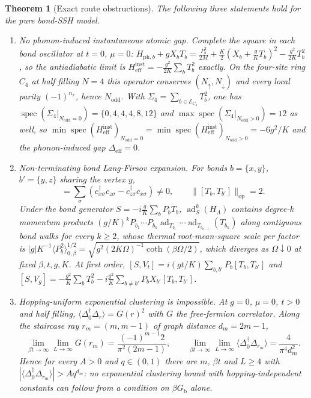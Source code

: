 \documentclass[11pt]{article}
\newtheorem{theorem}{Theorem}[section]
\theoremstyle{definition}
\theoremstyle{remark}
\DeclareMathOperator{\spec}{spec}
\newcommand{\Gb}{G_{\mathrm{b}}}
\begin{document}
\begin{theorem}[Exact route obstructions]
\label{thm:routes}
The following three statements hold for the pure bond-SSH model.
\begin{enumerate}[label=(\roman*),leftmargin=2.2em]
\item \emph{No phonon-induced instantaneous atomic gap.} Complete the square in each
bond oscillator at $t=0$, $\mu=0$:
$H_{\mathrm{ph},b}+gX_bT_b=\frac{P_b^2}{2M}+\frac{K}{2}(X_b+\frac{g}{K}T_b)^2
-\frac{g^2}{2K}T_b^2$, so the antiadiabatic limit is
$H^{\mathrm{inst}}_{\mathrm{eff}}=-\frac{g^2}{2K}\sum_bT_b^2$ exactly. On the
four-site ring $C_4$ at half filling $N=4$ this operator conserves
$(N_\uparrow,N_\downarrow)$ and every local parity $(-1)^{n_x}$, hence $N_{\mathrm{odd}}$.
With $\Sigma_4=\sum_{b\in\mathcal{E}_{C_4}}T_b^2$, one has
$\spec(\Sigma_4|_{N_{\mathrm{odd}}=0})=\{0,4,4,4,8,12\}$ and
$\max\spec(\Sigma_4|_{N_{\mathrm{odd}}>0})=12$ as well, so
$\min\spec(H^{\mathrm{inst}}_{\mathrm{eff}})_{N_{\mathrm{odd}}=0}=
\min\spec(H^{\mathrm{inst}}_{\mathrm{eff}})_{N_{\mathrm{odd}}>0}=-6g^2/K$ and the
phonon-induced gap
$\Delta_{\mathrm{eff}}=0$.
\item \emph{Non-terminating bond Lang-Firsov expansion.} For bonds
$b=\{x,y\}$, $b'=\{y,z\}$ sharing the vertex $y$,
\begin{equation}
[T_b,T_{b'}]=\sum_{\sigma}\left(c_{x\sigma}^\dagger c_{z\sigma}
-c_{z\sigma}^\dagger c_{x\sigma}\right)\ne0,\qquad
\bigl\|[T_b,T_{b'}]\bigr\|_{\mathrm{op}}=2 .
\label{eq:bondcomm}
\end{equation}
Under the bond generator $S=-i\frac{g}{K}\sum_bP_bT_b$,
$\operatorname{ad}_S^k(H_\Lambda)$ contains degree-$k$ momentum products
$(g/K)^kP_{b_1}\cdots P_{b_k}\operatorname{ad}_{T_{b_1}}\cdots
\operatorname{ad}_{T_{b_{k-1}}}(T_{b_k})$ along contiguous bond walks for every
$k\ge2$, whose thermal root-mean-square scale per factor is
$|g|K^{-1}\langle P_b^2\rangle_{0,\beta}^{1/2}
=\sqrt{g^2(2K\Omega)^{-1}\coth(\beta\Omega/2)}$, which diverges as $\Omega\downarrow0$
at fixed $\beta,t,g,K$. At first order,
$[S,V_t]=i(gt/K)\sum_{b,b'}P_b[T_b,T_{b'}]$ and
$[S,V_g]=-\frac{g^2}{K}\sum_bT_b^2-i\frac{g^2}{K}\sum_{b\ne b'}P_bX_{b'}[T_b,T_{b'}]$.
\item \emph{Hopping-uniform exponential clustering is impossible.} At $g=0$,
$\mu=0$, $t>0$ and half filling, $\langle\Delta_0^\dagger\Delta_r\rangle=G(r)^2$ with
$G$ the free-fermion correlator. Along the staircase ray $r_m=(m,m-1)$ of graph
distance $d_m=2m-1$,
\begin{equation}
\lim_{\beta t\to\infty}\lim_{L\to\infty}G(r_m)
=\frac{(-1)^{m-1}2}{\pi^2(2m-1)},\qquad
\lim_{\beta t\to\infty}\lim_{L\to\infty}
\langle\Delta_0^\dagger\Delta_{r_m}\rangle=\frac{4}{\pi^4d_m^2}.
\label{eq:staircase}
\end{equation}
Hence for every $A>0$ and $q\in(0,1)$ there are $m$, $\beta t$ and $L\ge4$ with
$|\langle\Delta_0^\dagger\Delta_{r_m}\rangle|>Aq^{d_m}$: no exponential clustering
bound with hopping-independent constants can follow from a condition on $\beta\Gb$
alone.
\end{enumerate}
\end{theorem}
\end{document}
